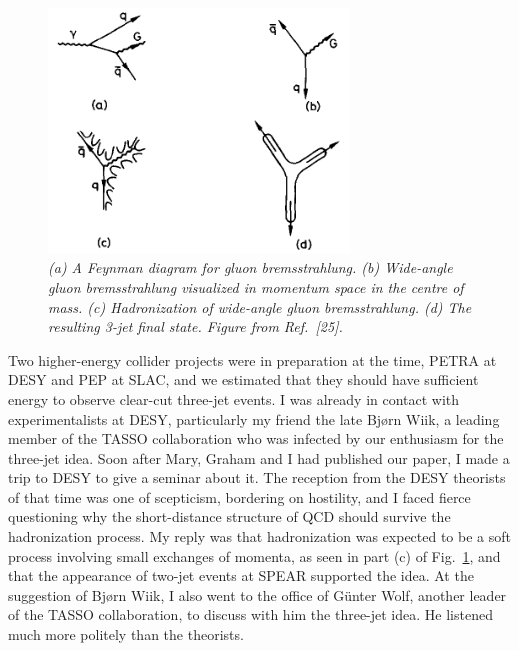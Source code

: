 \documentclass[12pt]{article} %
\begin{document}
\begin{figure}[htb]
\centerline{\includegraphics[width=8cm]{Mercedes.png}}
\caption{\it (a) A Feynman diagram for gluon bremsstrahlung. (b) Wide-angle gluon bremsstrahlung
visualized in momentum space in the centre of mass. (c) Hadronization of wide-angle gluon
bremsstrahlung. (d) The resulting 3-jet final state. Figure from Ref.~[25].} \label{Mercedes}
\end{figure}


Two higher-energy collider projects were in preparation at the time,
PETRA at DESY and PEP at SLAC, and we estimated that they should have sufficient energy to
observe clear-cut three-jet events. I was already in contact with experimentalists at DESY, 
particularly my friend the late Bj{\o}rn Wiik,
a leading member of the TASSO collaboration who was infected by our enthusiasm for the three-jet idea.
Soon after Mary, Graham and I had published our paper, I made a trip to DESY to give a seminar about it.
The reception from the DESY theorists of that time was one of scepticism, bordering on hostility,
and I faced fierce questioning why the short-distance structure of QCD should survive the hadronization process.
My reply was that hadronization was expected to be a soft process involving small exchanges of momenta,
as seen in part (c) of Fig.~\ref{Mercedes},
and that the appearance of two-jet events at SPEAR supported the idea.
At the suggestion of Bj{\o}rn Wiik, I also went to the office of G{\" u}nter Wolf,
another leader of the TASSO collaboration, to discuss with him the three-jet idea.
He listened much more politely than the theorists.
\end{document}
